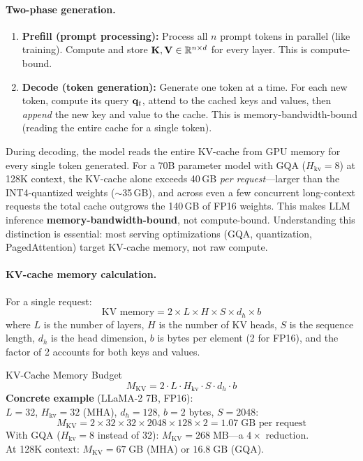 \paragraph{Two-phase generation.}
\begin{enumerate}
    \item \textbf{Prefill (prompt processing):}  Process all $n$ prompt tokens in
          parallel (like training).  Compute and store $\mathbf{K}, \mathbf{V} \in \mathbb{R}^{n \times d}$
          for every layer.  This is compute-bound.
    \item \textbf{Decode (token generation):}  Generate one token at a time.  For each
          new token, compute its query $\mathbf{q}_t$, attend to the cached keys and values,
          then \emph{append} the new key and value to the cache.  This is
          memory-bandwidth-bound (reading the entire cache for a single token).
\end{enumerate}

\begin{keyinsight}
During decoding, the model reads the entire KV-cache from GPU memory for every single
token generated.  For a 70B parameter model with GQA ($H_{\text{kv}}{=}8$) at 128K
context, the KV-cache alone exceeds 40\,GB \emph{per request}---larger than the INT4-quantized
weights ($\sim$35\,GB), and across even a few concurrent long-context requests the total
cache outgrows the 140\,GB of FP16 weights.  This makes LLM inference
\textbf{memory-bandwidth-bound}, not compute-bound.  Understanding this distinction is
essential: most serving optimizations (GQA, quantization, PagedAttention) target
KV-cache memory, not raw compute.
\end{keyinsight}

\paragraph{KV-cache memory calculation.}
For a single request:
\[
    \text{KV memory} = 2 \times L \times H \times S \times d_h \times b
\]
where $L$ is the number of layers, $H$ is the number of KV heads, $S$ is the sequence
length, $d_h$ is the head dimension, $b$ is bytes per element (2 for FP16), and the
factor of 2 accounts for both keys and values.

\begin{mathresult}{KV-Cache Memory Budget}
\[
    M_{\text{KV}} = 2 \cdot L \cdot H_{\text{kv}} \cdot S \cdot d_h \cdot b
\]
\textbf{Concrete example} (LLaMA-2 7B, FP16):\\
$L = 32$, $H_{\text{kv}} = 32$ (MHA), $d_h = 128$, $b = 2$ bytes, $S = 2048$:
\[
    M_{\text{KV}} = 2 \times 32 \times 32 \times 2048 \times 128 \times 2
    = 1.07\;\text{GB per request}
\]
With GQA ($H_{\text{kv}} = 8$ instead of 32): $M_{\text{KV}} = 268\;\text{MB}$---a $4\times$ reduction.\\
At 128K context: $M_{\text{KV}} = 67\;\text{GB}$ (MHA) or $16.8\;\text{GB}$ (GQA).
\end{mathresult}

